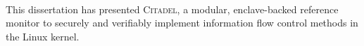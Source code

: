 \paragraph{} This dissertation has presented \textsc{Citadel}, a modular, enclave-backed reference monitor to securely and verifiably implement information flow control methods in the Linux kernel.